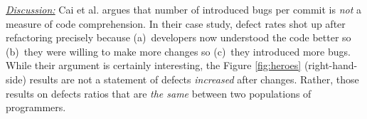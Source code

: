 \documentclass[conference,10pt]{IEEEtran}
\begin{document}





\noindent \textit{\underline{Discussion:}} 
Cai et al. \cite{cai19_debt} argues that number of introduced bugs
per commit is {\em not} a measure of code comprehension.
In their case study, defect rates shot up after refactoring
precisely because (a)~developers now understood the code better so (b)~they were willing to make more changes so (c)~they
introduced more bugs. While their argument is certainly interesting, the Figure \ref{fig:heroes} (right-hand-side) results
are not a statement of defects {\em increased} after changes.
Rather, those results on defects ratios that are {\em the same} between two populations of programmers. 
\end{document}
